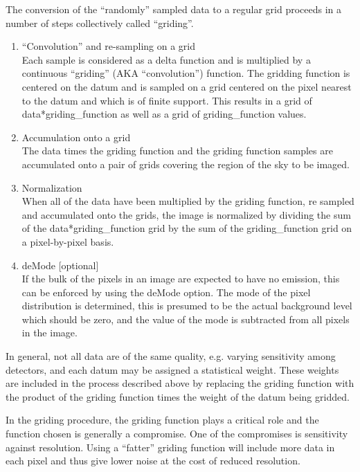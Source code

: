\documentclass[11pt]{report}
\begin{document}
The conversion of the ``randomly'' sampled data to a regular grid
proceeds in a number of steps collectively called ``griding''.
\begin{enumerate}
\item ``Convolution'' and re-sampling on a grid\\
Each sample is considered as a delta function and is multiplied by a
continuous ``griding'' (AKA ``convolution'') function.
The gridding function is centered on the datum and is sampled on a
grid centered on the pixel nearest to the datum and which is of finite
support. 
This results in a grid of data*griding\_function as well as a grid of
griding\_function values.
\item Accumulation onto a grid\\
The data times the griding function and the griding function
samples are accumulated onto a pair of grids covering the region of the
sky to be imaged.
\item Normalization\\
When all of the data have been multiplied by the griding function,
re sampled and accumulated onto the grids, the image is normalized
by dividing the sum of the data*griding\_function grid by the sum of the
griding\_function grid on a pixel-by-pixel basis.
\item deMode [optional]\\
If the bulk of the pixels in an image are expected to have no
emission, this can be enforced by using the deMode option.
The mode of the pixel distribution is determined, this is presumed to
be the actual background level which should be zero, and the value of
the mode is subtracted from all pixels in the image.
\end{enumerate}

In general, not all data are of the same quality, e.g. varying
sensitivity among detectors, and each datum may be assigned a
statistical weight.
These weights are included in the process described above by replacing
the griding function with the product of the griding function times
the weight of the datum being gridded.

In the griding procedure, the griding function plays a critical role
and the function chosen is generally a compromise.
One of the compromises is sensitivity against resolution.
Using a ``fatter'' griding function will include more data in each
pixel and thus give lower noise at the cost of reduced resolution.
\end{document}
